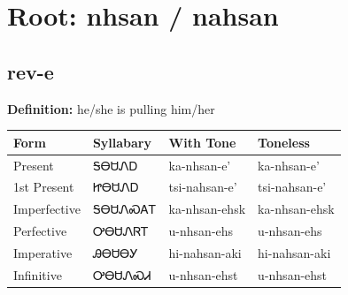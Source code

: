 \documentclass{article}%
\begin{document}
%
\normalsize%
\section*{Root: nhsan / nahsan}%
\subsection*{rev-e}%
\textbf{Definition: }%
he/she is pulling him/her%
\\[0.5em]%
\begin{tabular}{|l|l|l|l|}%
\hline%
\textbf{Form}&\textbf{Syllabary}&\textbf{With Tone}&\textbf{Toneless}\\%
\hline%
Present&ᎦᎾᏌᏁᎠ&ka{-}nhsan{-}e'&ka{-}nhsan{-}e'\\%
1st Present&ᏥᎾᏌᏁᎠ&tsi{-}nahsan{-}e'&tsi{-}nahsan{-}e'\\%
Imperfective&ᎦᎾᏌᏁᏍᎪᎢ&ka{-}nhsan{-}ehsk&ka{-}nhsan{-}ehsk\\%
Perfective&ᎤᎾᏌᏁᏒᎢ&u{-}nhsan{-}ehs&u{-}nhsan{-}ehs\\%
Imperative&ᎯᎾᏌᎾᎩ&hi{-}nahsan{-}aki&hi{-}nahsan{-}aki\\%
Infinitive&ᎤᎾᏌᏁᏍᏗ&u{-}nhsan{-}ehst&u{-}nhsan{-}ehst\\%
\hline%
\end{tabular}%
\\[1em]%
\end{document}
